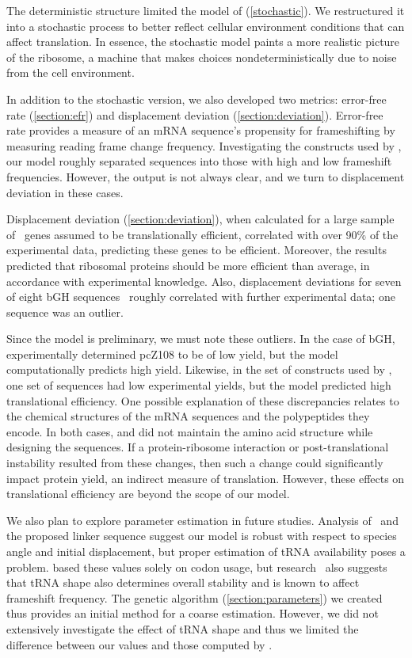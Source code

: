 \documentclass[twocolumn]{article}
\begin{document}
The deterministic structure limited the model of
\citeauthor{lalit:mechanics} (\autoref{stochastic}).
We restructured it into a stochastic process to better reflect cellular
environment conditions that can affect translation. In essence, the
stochastic model paints a more realistic picture of the ribosome, a
machine that makes choices nondeterministically due to noise from the
cell environment.

In addition to the stochastic version, we also developed two metrics:
error-free rate (\autoref{section:efr}) and displacement deviation
(\autoref{section:deviation}). Error-free rate
provides a measure of an mRNA sequence's propensity for frameshifting by
measuring reading frame change frequency.  Investigating the constructs used by
\citet{weiss87}, our model roughly separated sequences into
those with high and low frameshift frequencies. However, the
output is not always clear, and we turn to
displacement deviation in these cases.

Displacement deviation (\autoref{section:deviation}),
when calculated for a large sample of \ecoli\ genes assumed to be translationally efficient,
correlated with over 90\% of the  experimental data, predicting
these genes to be efficient.  Moreover, the results predicted that ribosomal proteins should
be more efficient than average, in accordance with experimental knowledge. Also, displacement deviations for seven of eight bGH
sequences~\cite{schoner:bgh} roughly correlated with further
experimental data; one sequence was an outlier.

Since the model is preliminary, we must note these outliers.  In the
case of bGH, \citeauthor{schoner:bgh} experimentally determined pcZ108 to be
of low yield, but the model computationally predicts high yield.
Likewise, in the set of constructs used by \citeauthor{weiss87}, one
set of sequences had low experimental yields, but the model predicted high translational efficiency.  One
possible explanation of these discrepancies relates to the chemical
structures of the mRNA sequences and the polypeptides they
encode.  In both cases, \citeauthor{weiss87} and
\citeauthor{schoner:bgh} did not maintain the amino
acid structure while designing the sequences. If a protein-ribosome
interaction or post-translational instability resulted from these
changes, then such a change could significantly impact protein yield, an
indirect measure of translation. However, these effects on
translational efficiency are beyond the scope of our model.

We also plan to explore parameter estimation in future studies.
Analysis of \prfB\ and the
proposed linker sequence suggest our model is robust with respect to species angle
and initial displacement, but proper estimation of tRNA availability
poses a problem. \citet{lalit:mechanics} based these values solely on 
codon usage, but research~\cite{phelps} also suggests that tRNA shape
also determines overall stability and is known to affect
frameshift frequency. The
genetic algorithm (\autoref{section:parameters}) we created thus
provides an initial method for a coarse estimation. However, we did
not extensively investigate the effect of tRNA shape and thus we limited the
difference between our values and those computed by \citeauthor{lalit:mechanics}.
\end{document}
